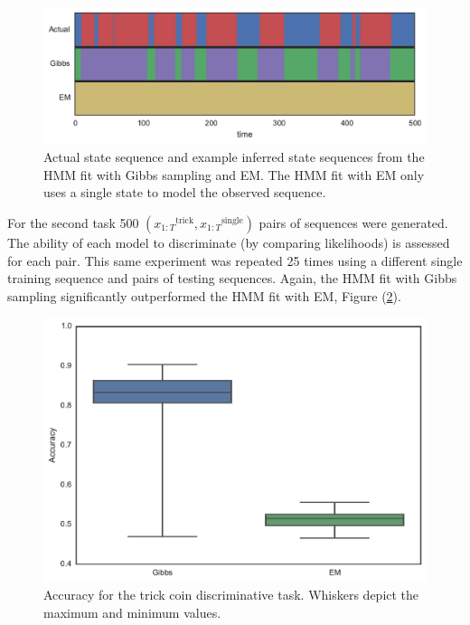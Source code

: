 \documentclass[12pt]{report}
\newcommand{\1}[0]{\mathbbm{1}}
\newcommand{\seq}[3]{\ensuremath{#1_{{#2}:{#3}}}}
\begin{document}
\begin{figure}[H]
    \centering
    \includegraphics[width=1\textwidth]{img/trick_coin_states.pdf}
    \caption{Actual state sequence and example inferred state sequences from the 
    \ac{HMM} fit with Gibbs sampling and \ac{EM}. The \ac{HMM} fit with \ac{EM}
    only uses a single state to model the observed sequence.}
    \label{fig:trick-coin-states}
\end{figure}

For the second task 500 $(\seq{x}{1}{T}^{\text{trick}}, \seq{x}{1}{T}^\text{single})$ pairs 
of sequences were generated. The ability of each model to discriminate (by comparing likelihoods) 
is assessed for each pair. This same experiment was repeated 25 times using a different single 
training sequence and pairs of testing sequences. Again, the \ac{HMM} fit with Gibbs sampling
significantly outperformed the \ac{HMM} fit with \ac{EM}, Figure (\ref{fig:trick-coin-disc}).

\begin{figure}[H]
    \centering
    \includegraphics[width=1\textwidth]{img/trick_coin_disc_accuracy.pdf}
    \caption{Accuracy for the trick coin discriminative task. Whiskers 
    depict the maximum and minimum values.}
    \label{fig:trick-coin-disc}
\end{figure}
\end{document}
